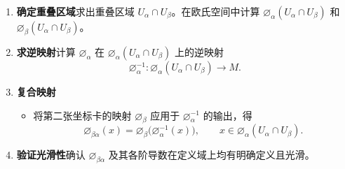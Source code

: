 \begin{enumerate}
  \item \textbf{确定重叠区域}\quad 求出重叠区域 $U_\alpha\cap U_\beta$。在欧氏空间中计算
  $\varnothing_\alpha(U_\alpha\cap U_\beta)$ 和 $\varnothing_\beta(U_\alpha\cap U_\beta)$。
  \item \textbf{求逆映射}\quad 计算 $\varnothing_\alpha$ 在 $\varnothing_\alpha(U_\alpha\cap U_\beta)$ 上的逆映射
  \[
    \varnothing_\alpha^{-1}\colon\varnothing_\alpha(U_\alpha\cap U_\beta)\longrightarrow M.
  \]
  \item \textbf{复合映射}
  \begin{itemize}
    \item 将第二张坐标卡的映射 $\varnothing_\beta$ 应用于 $\varnothing_\alpha^{-1}$ 的输出，得
    \[
      \varnothing_{\beta\alpha}(x)
      =\varnothing_\beta\bigl(\varnothing_\alpha^{-1}(x)\bigr),\qquad
      x\in\varnothing_\alpha(U_\alpha\cap U_\beta).
    \]
  \end{itemize}
  \item \textbf{验证光滑性}\quad 确认 $\varnothing_{\beta\alpha}$ 及其各阶导数在定义域上均有明确定义且光滑。
\end{enumerate}

